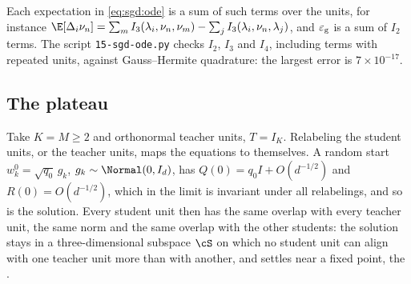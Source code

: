 \begin{refsection}
Each expectation in \eqref{eq:sgd:ode} is a sum of such terms over the units, for instance $\E[\Delta_i\nu_n]=\sum_mI_3(\lambda_i,\nu_n,\nu_m)-\sum_jI_3(\lambda_i,\nu_n,\lambda_j)$, and $\varepsilon_{\mathrm g}$ is a sum of $I_2$ terms. The script \texttt{15-sgd-ode.py} checks $I_2$, $I_3$ and $I_4$, including terms with repeated units, against Gauss--Hermite quadrature: the largest error is $7\times10^{-17}$.

\subsection{The plateau}

Take $K=M\ge2$ and orthonormal teacher units, $T=I_K$. Relabeling the student units, or the teacher units, maps the equations to themselves. A random start $w_k^0=\sqrt{q_0}\,g_k$, $g_k\sim\Normal(0,I_d)$, has $Q(0)=q_0I+O(d^{-1/2})$ and $R(0)=O(d^{-1/2})$, which in the limit is invariant under all relabelings, and so is the solution. Every student unit then has the same overlap with every teacher unit, the same norm and the same overlap with the other students: the solution stays in a three-dimensional subspace $\cS$ on which no student unit can align with one teacher unit more than with another, and settles near a fixed point, the .


\end{refsection}
